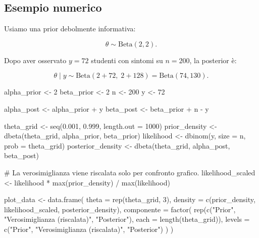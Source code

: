 \documentclass[
  italian,
  letterpaper,
  a4paper,
  11pt,
  open=any]{scrbook}
\newenvironment{Shaded}{\begin{snugshade}}{\end{snugshade}}
\newcommand{\AttributeTok}[1]{\textcolor[rgb]{0.40,0.45,0.13}{#1}}
\newcommand{\CommentTok}[1]{\textcolor[rgb]{0.37,0.37,0.37}{#1}}
\newcommand{\DecValTok}[1]{\textcolor[rgb]{0.68,0.00,0.00}{#1}}
\newcommand{\FloatTok}[1]{\textcolor[rgb]{0.68,0.00,0.00}{#1}}
\newcommand{\FunctionTok}[1]{\textcolor[rgb]{0.28,0.35,0.67}{#1}}
\newcommand{\NormalTok}[1]{\textcolor[rgb]{0.00,0.23,0.31}{#1}}
\newcommand{\OtherTok}[1]{\textcolor[rgb]{0.00,0.23,0.31}{#1}}
\newcommand{\SpecialCharTok}[1]{\textcolor[rgb]{0.37,0.37,0.37}{#1}}
\newcommand{\StringTok}[1]{\textcolor[rgb]{0.13,0.47,0.30}{#1}}
\theoremstyle{plain}
\theoremstyle{definition}
\theoremstyle{definition}
\theoremstyle{remark}
\begin{document}
\subsection{Esempio numerico}\label{esempio-numerico-1}

Usiamo una prior debolmente informativa:

\[
\theta \sim \text{Beta}(2,2).
\]

Dopo aver osservato \(y=72\) studenti con sintomi su \(n=200\), la
posterior è:

\[
\theta \mid y \sim \text{Beta}(2+72,\; 2+128)
= \text{Beta}(74,130).
\]

\begin{Shaded}
\begin{Highlighting}[]
\NormalTok{alpha\_prior }\OtherTok{\textless{}{-}} \DecValTok{2}
\NormalTok{beta\_prior }\OtherTok{\textless{}{-}} \DecValTok{2}
\NormalTok{n }\OtherTok{\textless{}{-}} \DecValTok{200}
\NormalTok{y }\OtherTok{\textless{}{-}} \DecValTok{72}

\NormalTok{alpha\_post }\OtherTok{\textless{}{-}}\NormalTok{ alpha\_prior }\SpecialCharTok{+}\NormalTok{ y}
\NormalTok{beta\_post }\OtherTok{\textless{}{-}}\NormalTok{ beta\_prior }\SpecialCharTok{+}\NormalTok{ n }\SpecialCharTok{{-}}\NormalTok{ y}

\NormalTok{theta\_grid }\OtherTok{\textless{}{-}} \FunctionTok{seq}\NormalTok{(}\FloatTok{0.001}\NormalTok{, }\FloatTok{0.999}\NormalTok{, }\AttributeTok{length.out =} \DecValTok{1000}\NormalTok{)}
\NormalTok{prior\_density }\OtherTok{\textless{}{-}} \FunctionTok{dbeta}\NormalTok{(theta\_grid, alpha\_prior, beta\_prior)}
\NormalTok{likelihood }\OtherTok{\textless{}{-}} \FunctionTok{dbinom}\NormalTok{(y, }\AttributeTok{size =}\NormalTok{ n, }\AttributeTok{prob =}\NormalTok{ theta\_grid)}
\NormalTok{posterior\_density }\OtherTok{\textless{}{-}} \FunctionTok{dbeta}\NormalTok{(theta\_grid, alpha\_post, beta\_post)}

\CommentTok{\# La verosimiglianza viene riscalata solo per confronto grafico.}
\NormalTok{likelihood\_scaled }\OtherTok{\textless{}{-}}\NormalTok{ likelihood }\SpecialCharTok{*} \FunctionTok{max}\NormalTok{(prior\_density) }\SpecialCharTok{/} \FunctionTok{max}\NormalTok{(likelihood)}

\NormalTok{plot\_data }\OtherTok{\textless{}{-}} \FunctionTok{data.frame}\NormalTok{(}
  \AttributeTok{theta =} \FunctionTok{rep}\NormalTok{(theta\_grid, }\DecValTok{3}\NormalTok{),}
  \AttributeTok{density =} \FunctionTok{c}\NormalTok{(prior\_density, likelihood\_scaled, posterior\_density),}
  \AttributeTok{componente =} \FunctionTok{factor}\NormalTok{(}
    \FunctionTok{rep}\NormalTok{(}\FunctionTok{c}\NormalTok{(}\StringTok{"Prior"}\NormalTok{, }\StringTok{"Verosimiglianza (riscalata)"}\NormalTok{, }\StringTok{"Posterior"}\NormalTok{),}
        \AttributeTok{each =} \FunctionTok{length}\NormalTok{(theta\_grid)),}
    \AttributeTok{levels =} \FunctionTok{c}\NormalTok{(}\StringTok{"Prior"}\NormalTok{, }\StringTok{"Verosimiglianza (riscalata)"}\NormalTok{, }\StringTok{"Posterior"}\NormalTok{)}
\NormalTok{  )}
\NormalTok{)}


\end{Highlighting}
\end{Shaded}
\end{document}
